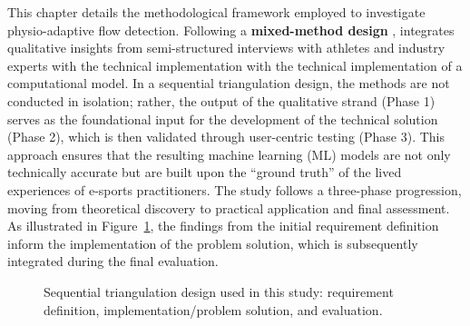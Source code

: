 
\noindent
This chapter details the methodological framework employed to investigate physio-adaptive flow detection. Following a \textbf{mixed-method design} \autocite{creswell2017research}, integrates qualitative insights from semi-structured interviews with athletes and industry experts with the technical implementation with the technical implementation of a computational model. In a sequential triangulation design, the methods are not conducted in isolation; rather, the output of the qualitative strand (Phase 1) serves as the foundational input for the development of the technical solution (Phase 2), which is then validated through user-centric testing (Phase 3). This approach ensures that the resulting machine learning (ML) models are not only technically accurate but are built upon the \enquote{ground truth} of the lived experiences of e-sports practitioners. The study follows a three-phase progression, moving from theoretical discovery to practical application and final assessment. As illustrated in Figure~\ref{fig:sequentialTriangulation}, the findings from the initial requirement definition inform the implementation of the problem solution, which is subsequently integrated during the final evaluation.

\begin{figure}[htbp]
    \centering
    \caption{Sequential triangulation design used in this study: requirement definition, implementation/problem solution, and evaluation.}
    \label{fig:sequentialTriangulation}
\end{figure}

